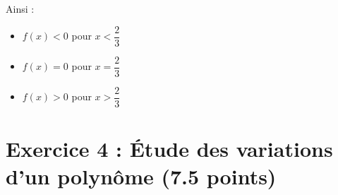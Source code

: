 \documentclass[answers]{exam}
\begin{document}
\begin{questions}
\begin{parts}
\begin{solution}
  Ainsi :
  \begin{itemize}
    \item \( f(x) < 0 \) pour \( x < \dfrac{2}{3} \)
    \item \( f(x) = 0 \) pour \( x = \dfrac{2}{3} \)
    \item \( f(x) > 0 \) pour \( x > \dfrac{2}{3} \)
  \end{itemize}
  \end{solution}
\end{parts}

\end{questions}

\section*{Exercice 4 : Étude des variations d’un polynôme (7.5 points)}
\end{document}
